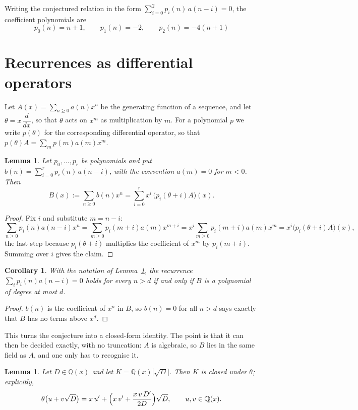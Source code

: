 \documentclass[11pt,a4paper]{article}
\theoremstyle{plain}
\newtheorem{lemma}[theorem]{Lemma}
\newtheorem{corollary}[theorem]{Corollary}
\theoremstyle{definition}
\begin{document}
Writing the conjectured relation in the form $\sum_{i=0}^{2}p_{i}(n)\,a(n-i)=0$,
the coefficient polynomials are
\[
p_{0}(n)=n + 1,\qquad p_{1}(n)=-2,\qquad p_{2}(n)=- 4 \left(n + 1\right)
\]

\section{Recurrences as differential operators}

Let $A(x)=\sum_{n\ge0}a(n)x^{n}$ be the generating function of a sequence, and let
$\theta=x\,\dfrac{d}{dx}$, so that $\theta$ acts on $x^{m}$ as multiplication by $m$. For a
polynomial $p$ we write $p(\theta)$ for the corresponding differential operator, so that
$p(\theta)A=\sum_{m}p(m)a(m)x^{m}$.

\begin{lemma}\label{lem:transfer}
Let $p_{0},\dots,p_{r}$ be polynomials and put $b(n)=\sum_{i=0}^{r}p_{i}(n)\,a(n-i)$, with
the convention $a(m)=0$ for $m<0$. Then
\[
B(x):=\sum_{n\ge0}b(n)x^{n}=\sum_{i=0}^{r}x^{i}\,\bigl(p_{i}(\theta+i)A\bigr)(x).
\]
\end{lemma}

\begin{proof}
Fix $i$ and substitute $m=n-i$:
\[
\sum_{n\ge0}p_{i}(n)a(n-i)x^{n}=\sum_{m\ge0}p_{i}(m+i)a(m)x^{m+i}
=x^{i}\sum_{m\ge0}p_{i}(m+i)a(m)x^{m}=x^{i}\bigl(p_{i}(\theta+i)A\bigr)(x),
\]
the last step because $p_{i}(\theta+i)$ multiplies the coefficient of $x^{m}$ by
$p_{i}(m+i)$. Summing over $i$ gives the claim.
\end{proof}

\begin{corollary}\label{cor:criterion}
With the notation of Lemma~\ref{lem:transfer}, the recurrence
$\sum_{i}p_{i}(n)a(n-i)=0$ holds for every $n>d$ if and only if $B$ is a polynomial of
degree at most $d$.
\end{corollary}

\begin{proof}
$b(n)$ is the coefficient of $x^{n}$ in $B$, so $b(n)=0$ for all $n>d$ says exactly that
$B$ has no terms above $x^{d}$.
\end{proof}

This turns the conjecture into a closed-form identity. The point is that it can then be
decided exactly, with no truncation: $A$ is algebraic, so $B$ lies in the same field as
$A$, and one only has to recognise it.

\begin{lemma}\label{lem:field}
Let $D\in\mathbb{Q}(x)$ and let $K=\mathbb{Q}(x)\bigl[\sqrt{D}\bigr]$. Then $K$ is closed
under $\theta$; explicitly,
\[
\theta\bigl(u+v\sqrt{D}\bigr)=x\,u'+\Bigl(x\,v'+\frac{x\,v\,D'}{2D}\Bigr)\sqrt{D},
\qquad u,v\in\mathbb{Q}(x).
\]
\end{lemma}
\end{document}
